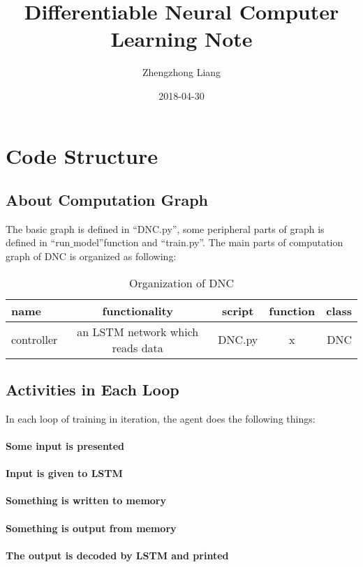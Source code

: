 \documentclass{article}
\title{Differentiable Neural Computer Learning Note}
\author{Zhengzhong Liang}
\date{2018-04-30}
\begin{document}
\maketitle
\section{Code Structure}
\subsection{About Computation Graph}
The basic graph is defined in ``DNC.py'', some peripheral parts of graph is defined in ``run$\_$model''function and ``train.py''. The main parts of computation graph of DNC is organized as following:
\begin{table}
\centering
\caption{Organization of DNC}
\begin{tabular}{| l | c | c | c | r |} \hline
name & functionality & script & function & class \\ \hline
controller & an LSTM network which reads data & DNC.py & x & DNC \\ \hline
\end{tabular}
\end{table}

\subsection{Activities in Each Loop}
In each loop of training in iteration, the agent does the following things: 
\paragraph{Some input is presented}
\paragraph{Input is given to LSTM}
\paragraph{Something is written to memory}
\paragraph{Something is output from memory}
\paragraph{The output is decoded by LSTM and printed}
\end{document}
